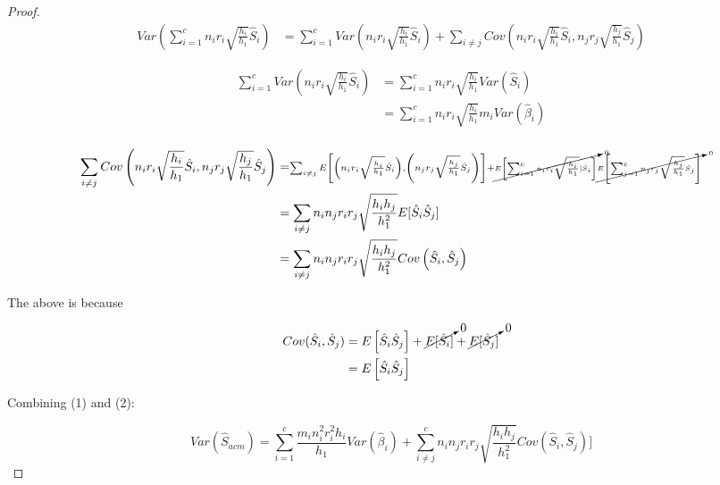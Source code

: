 \documentclass{article}
\begin{document}
\begin{proof}

$$
\begin{aligned}
Var(\sum^c_{i=1} n_i r_i \sqrt{\frac{h_i}{h_1}} \hat{S}_i) &= \sum^c_{i=1} Var \left( n_i r_i \sqrt{\frac{h_i}{h_1}} \hat{S}_i \right) + \sum_{i \neq j} Cov \left( n_i r_i \sqrt{\frac{h_i}{h_1}} \hat{S}_i, n_j r_j \sqrt{\frac{h_j}{h_1}} \hat{S}_j \right) 
\end{aligned}
$$

\begin{equation}
\begin{aligned}
\sum^c_{i=1} Var \left( n_i r_i \sqrt{\frac{h_i}{h_1}} \hat{S}_i \right) &= \sum^c_{i=1} n_i r_i \sqrt{\frac{h_i}{h_1}}  Var(\hat{S}_i) \\
&= \sum^c_{i=1} n_i r_i \sqrt{\frac{h_i}{h_1}} m_i Var(\hat{\beta}_i)      \\
\end{aligned}
\end{equation}

\begin{equation}
\begin{aligned}
\sum_{i \neq j} Cov \left(  n_i r_i \sqrt{\frac{h_i}{h_1}} \hat{S}_i,  n_j r_j \sqrt{\frac{h_j}{h_1}} \hat{S}_j \right) &= \scriptstyle \sum_{i \neq j} E \left[ \left( n_i r_i \sqrt{\frac{h_i}{h_1}} \hat{S}_i \right), \left( n_j r_j \sqrt{\frac{h_j}{h_1}} \hat{S}_j  \right)  \right] + \scriptscriptstyle \cancelto{0}{E \left[ \sum^c_{i=1} n_i r_i \sqrt{\frac{h_i}{h_1}}] \hat{S}_i \right]} \cancelto{0}{E \left[ \sum^c_{j=1} n_j r_j \sqrt{\frac{h_j}{h_1}} \hat{S}_j \right]} \\
&= \sum_{i \neq j} n_i n_j r_i r_j \sqrt{\frac{h_i h_j}{h^2_1}} E[\hat{S}_i \hat{S}_j]\\ 
&= \sum_{i \neq j} n_i n_j r_i r_j \sqrt{\frac{h_i h_j}{h^2_1}} Cov \left( \hat{S}_i, \hat{S}_j \right) \\ 
\end{aligned}
\end{equation}


The above is because

$$
\begin{aligned}
Cov( \hat{S}_i, \hat{S}_j) &= E \left[ \hat{S}_i \hat{S}_j \right] + \cancelto{0}{E[ \hat{S}_i]} + \cancelto{0}{E[ \hat{S}_j ]} \\
&=  E \left[ \hat{S}_i \hat{S}_j \right]
\end{aligned}
$$

Combining (1) and (2): 

$$ Var(\hat{S}_{acm}) =\sum^c_{i=1}  \frac{m_i n^2_i r^2_i h_i}{h_1}  Var(\hat{\beta}_i) +  \sum^c_{i \neq j} n_i n_j r_i r_j \sqrt{\frac{h_i h_j}{h^2_1}} Cov(\hat{S}_i, \hat{S}_j)] $$

\end{proof}
\end{document}
